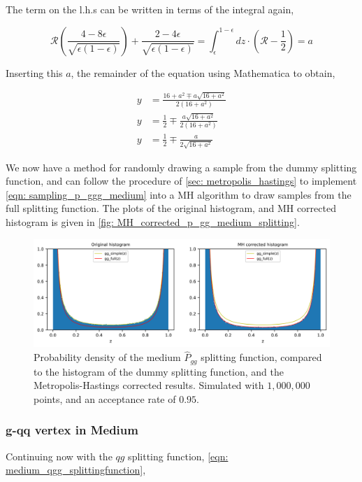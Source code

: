 \documentclass[main.tex]{subfiles}
\begin{document}
The term on the l.h.s can be written in terms of the integral again, 

\begin{equation}
    \mathcal{R} \left(  \frac{4-8\epsilon}{\sqrt{\epsilon(1-\epsilon)}} \right) + \frac{2-4\epsilon}{\sqrt{\epsilon(1-\epsilon)}}  = \int_\epsilon^{1-\epsilon} dz \cdot \left(\mathcal{R} - \frac{1}{2} \right) = a
\end{equation}

Inserting this \(a\), the remainder of the equation using Mathematica to obtain, 

\begin{align}\label{eqn: sampling_p_ggg_medium}
    y &= \frac{16 + a^2 \mp a \sqrt{16 + a^2}}{2 (16 + a^2)} \nonumber\\
    y &= \frac{1}{2} \mp \frac{a \sqrt{16 + a^2}}{2 (16 + a^2)} \nonumber\\
    y &= \frac{1}{2} \mp \frac{a }{2 \sqrt{16 + a^2}}
\end{align}

We now have a method for randomly drawing a sample from the dummy splitting function, and can follow the procedure of \autoref{sec: metropolis_hastings} to implement \autoref{eqn: sampling_p_ggg_medium} into a MH algorithm to draw samples from the full splitting function. The plots of the original histogram, and MH corrected histogram is given in \autoref{fig: MH_corrected_p_gg_medium_splitting}.

\begin{figure}[ht]
    \centering
    \includegraphics[width=14cm]{pictures/MH_plots/MH_medium_gg.png}
    \caption{Probability density of the medium \(\hat{P}_{gg}\) splitting function, compared to the histogram of the dummy splitting function, and the Metropolis-Hastings corrected results. Simulated with \(1,000,000\) points, and an acceptance rate of \(0.95\).}
    \label{fig: MH_corrected_p_gg_medium_splitting}
\end{figure}

\subsubsection{g-qq vertex in Medium}
Continuing now with the \(qg\) splitting function, \autoref{eqn: medium_qgg_splittingfunction}, 
\end{document}

